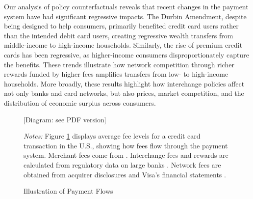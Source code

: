 \documentclass[11pt,english]{article}
\theoremstyle{remark}
\begin{document}
Our analysis of policy counterfactuals reveals that recent changes in the payment system have had significant regressive impacts.
The Durbin Amendment, despite being designed to help consumers, primarily benefited credit card users rather than the intended debit card users, creating regressive wealth transfers from middle-income to high-income households.
Similarly, the rise of premium credit cards has been regressive, as higher-income consumers disproportionately capture the benefits.
These trends illustrate how network competition through richer rewards funded by higher fees amplifies transfers from low- to high-income households.
More broadly, these results highlight how interchange policies affect not only banks and card networks, but also prices, market competition, and the distribution of economic surplus across consumers.

\clearpage{}
\begin{singlespace}
\begin{flushleft}
{

}{\par}

\par\end{flushleft}
\end{singlespace}

\clearpage{}


\begin{figure}[H]
\caption{Illustration of Payment Flows\label{fig:payment-flow}}


[Diagram: see PDF version]

\par\textit{Notes:} Figure \ref{fig:payment-flow} displays average fee levels for a credit card transaction in the U.S., showing how fees flow through the payment system. Merchant fees come from \citet{Nilson2023}. Interchange fees and rewards are calculated from regulatory data on large banks \citep{Drechsler.etal2025}. Network fees are obtained from acquirer disclosures and Visa's financial statements \citep{Visa2020,Helcim2021}.

\end{figure}
\end{document}
